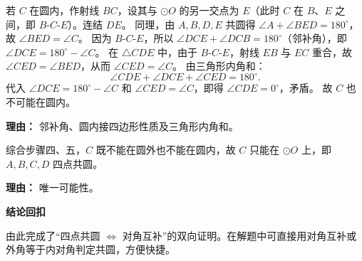 \begin{proofbox}
\begin{description}[style=nextline, leftmargin=2.8em, labelsep=0.5em, itemsep=0.55em]
		\item[\textbf{步骤五（$C$ 在圆内引出矛盾）：}]
			若 $C$ 在圆内，作射线 $BC$，设其与 $\odot O$ 的另一交点为 $E$（此时 $C$ 在 $B$、$E$ 之间，即 $B$-$C$-$E$）。连结 $DE$。
			同理，由 $A,B,D,E$ 共圆得 $\angle A + \angle BED = 180^\circ$，故 $\angle BED = \angle C$。
			因为 $B$-$C$-$E$，所以 $\angle DCE + \angle DCB = 180^\circ$（邻补角），即 $\angle DCE = 180^\circ - \angle C$。
			在 $\triangle CDE$ 中，由于 $B$-$C$-$E$，射线 $EB$ 与 $EC$ 重合，故 $\angle CED = \angle BED$，从而 $\angle CED = \angle C$。
			由三角形内角和：
			\[
				\angle CDE + \angle DCE + \angle CED = 180^\circ.
			\]
			代入 $\angle DCE = 180^\circ - \angle C$ 和 $\angle CED = \angle C$，即得 $\angle CDE = 0^\circ$，矛盾。
			故 $C$ 也不可能在圆内。
			\par\textbf{理由：} 邻补角、圆内接四边形性质及三角形内角和。

		\item[\textbf{步骤六（合情结论）：}]
			综合步骤四、五，$C$ 既不能在圆外也不能在圆内，故 $C$ 只能在 $\odot O$ 上，即 $A,B,C,D$ 四点共圆。
			\par\textbf{理由：} 唯一可能性。
	\end{description}

	\medskip
	\textbf{\textcolor{CProof}{结论回扣}}

	由此完成了“四点共圆 $\iff$ 对角互补”的双向证明。在解题中可直接用对角互补或外角等于内对角判定共圆，方便快捷。
\end{proofbox}
